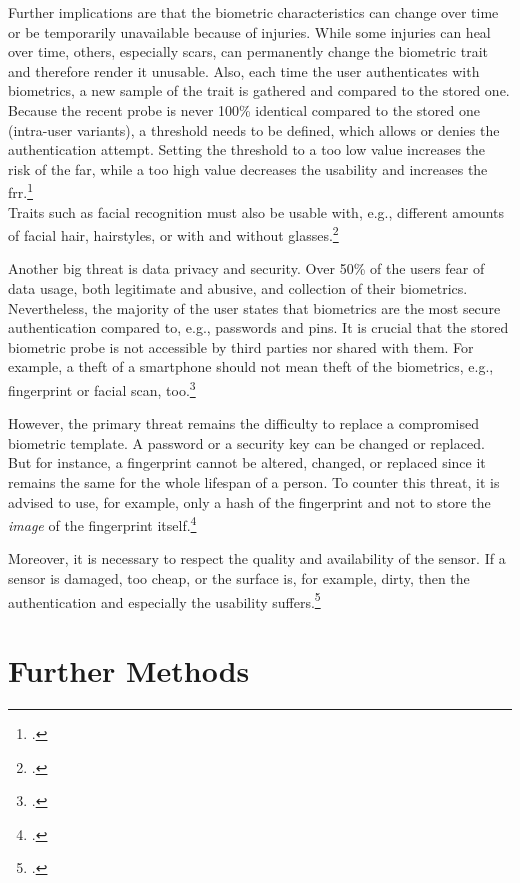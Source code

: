 Further implications are that the biometric characteristics can change over time or be temporarily unavailable because of injuries. While some injuries can heal over time, others, especially scars, can permanently change the biometric trait and therefore render it unusable. Also, each time the user authenticates with biometrics, a new sample of the trait is gathered and compared to the stored one. Because the recent probe is never 100\% identical compared to the stored one (\frqq intra-user variants\flqq), a threshold needs to be defined, which allows or denies the authentication attempt. Setting the threshold to a too low value increases the risk of the \gls{far}, while a too high value decreases the usability and increases the \gls{frr}.\footcite[See][13--17, 52]{Jain2011}\\Traits such as facial recognition must also be usable with, e.g., different amounts of facial hair, hairstyles, or with and without glasses.\footcite[See][98]{Jain2011}

Another big threat is data privacy and security. Over 50\% of the users fear of data usage, both legitimate and abusive, and collection of their biometrics. Nevertheless, the majority of the user states that biometrics are the most secure authentication compared to, e.g., passwords and \glspl{pin}. It is crucial that the stored biometric probe is not accessible by third parties nor shared with them. For example, a theft of a smartphone should not mean theft of the biometrics, e.g., fingerprint or facial scan, too.\footcites[See][8]{ibm-security}

However, the primary threat remains the difficulty to replace a compromised biometric template. A password or a security key can be changed or replaced. But for instance, a fingerprint cannot be altered, changed, or replaced since it remains the same for the whole lifespan of a person. To counter this threat, it is advised to use, for example, only a hash of the fingerprint and not to store the \textit{image} of the fingerprint itself.\footcites[See][266]{shostack2014threat}

Moreover, it is necessary to respect the quality and availability of the sensor. If a sensor is damaged, too cheap, or the surface is, for example, dirty, then the authentication and especially the usability suffers.\footcites[See][37]{265831}

\section{Further Methods}

